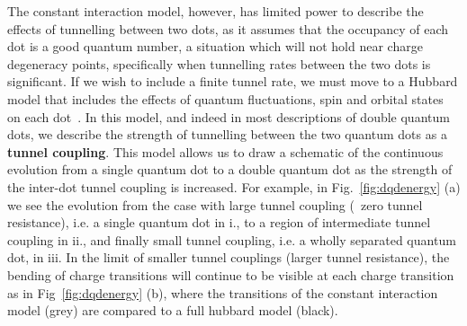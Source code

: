 The constant interaction model, however, has limited power to describe the effects of tunnelling between two dots,
as it assumes that the occupancy of each dot is a good quantum number, a situation which will not hold near
charge degeneracy points, specifically when tunnelling rates between the two dots is significant. If we wish to include a finite tunnel
rate, we must move to a Hubbard model that includes the effects of quantum fluctuations, spin and orbital states on each
dot~\cite{PhysRevB.84.115301}. In this model, and indeed in most descriptions of double quantum dots, we
describe the strength of tunnelling between the two quantum dots as a \textbf{tunnel coupling}. This model allows us to draw a schematic
of the continuous evolution from a single quantum dot to a double quantum dot as the strength of the inter-dot tunnel coupling
is increased. For example, in Fig.~\ref{fig:dqdenergy} (a) we see the evolution from the case with large tunnel coupling (~zero tunnel resistance), i.e. a single
quantum dot in i., to a region of intermediate tunnel coupling in ii., and finally small tunnel coupling, i.e. a wholly separated quantum dot, in iii. In the
limit of smaller tunnel couplings (larger tunnel resistance), the bending of charge transitions will continue to be visible
at each charge transition as in Fig~\ref{fig:dqdenergy} (b), where the transitions of the constant interaction model (grey) are compared to
a full hubbard model (black).

